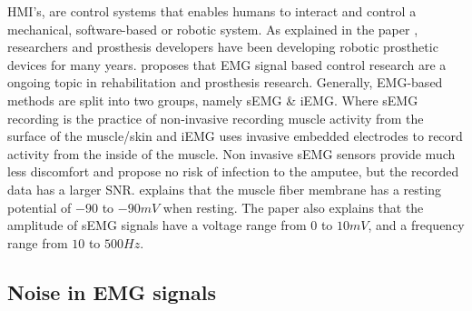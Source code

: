 \documentclass[../main.tex]{subfiles}
\begin{document}
\gls{HMI}'s, are control systems that enables humans to interact and control a mechanical, software-based or robotic system.
As explained in the paper \cite{Tech2015}, researchers and prosthesis developers have been developing robotic prosthetic devices for many years.
\cite{Tech2015} proposes that \gls{EMG} signal based control research are a ongoing topic in rehabilitation and prosthesis research.
Generally, \gls{EMG}-based methods are split into two groups, namely \gls{sEMG} \& \gls{iEMG}.
Where \gls{sEMG} recording is the practice of non-invasive recording muscle activity from the surface of the muscle/skin and \gls{iEMG} uses invasive embedded electrodes to record activity from the inside of the muscle.
Non invasive \gls{sEMG} sensors provide much less discomfort and propose no risk of infection to the amputee, but the recorded data has a larger \gls{SNR}.
\cite{Tech2015} explains that the muscle fiber membrane has a resting potential of $-90$ to $-90 mV$ when resting. The paper also explains that the amplitude of sEMG signals have a voltage range from $0$ to $10 mV$, and a frequency range from $10$ to $500 Hz$.

\subsection{Noise in EMG signals}
\label{sec:noise}
\end{document}
